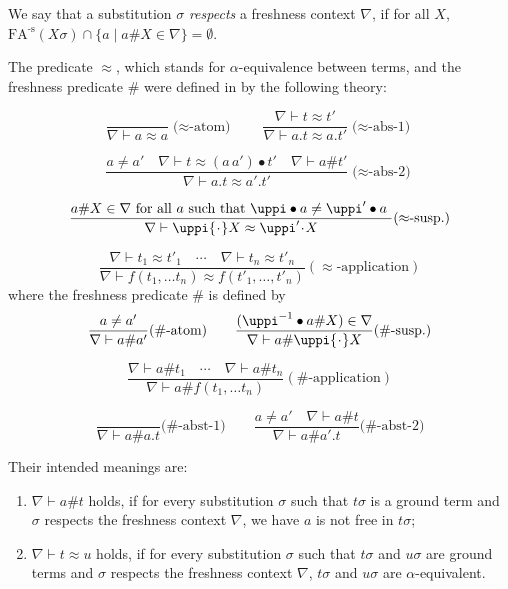 \documentclass{llncs}
\newcommand{\permap}{{\mkern 1mu\cdot \mkern 1mu}}
\newcommand{\permef}{\bullet}
\newcommand\ppi{\uppi}
\newcommand{\fatoms}{\mathrm{FA^{\text{-s}}}}
\begin{document}
We say that a substitution $\sigma$ \emph{respects} a freshness
context $\nabla$, if for all $X$, $\fatoms(X\sigma)\cap
\{a \mid a\# X \in \nabla\} = \emptyset$.

The predicate $\approx$, which stands for $\alpha$-equivalence between terms, 
and the freshness predicate $ \#$ were defined in
\cite{DBLP:conf/csl/UrbanPG03,DBLP:journals/tcs/UrbanPG04} by the following theory:

\[\frac{}{ \nabla\vdash a\approx a}\text{($\approx$-atom)}\qquad \frac{ \nabla \vdash t \approx t'}{ \nabla\vdash a.t\approx a.t'}\text{($\approx$-abs-1)} \]

\[\frac{ a\neq a'\quad \nabla \vdash t \approx (a\,a')\permef t' \quad \nabla \vdash a\# t'}{ \nabla\vdash a.t\approx a'.t'}\text{($\approx$-abs-2)}\]

\[\frac{{ a\# X}\in \nabla \text{ for all $a$ such that $ \ppi \permef a \neq \ppi'\permef a$ }}{ \nabla \vdash \ppi \permap X \approx \ppi'\permap X}\text{($\approx$-susp.)}\]

\[\frac{ \nabla \vdash t_1\approx t'_1 \quad \cdots \quad \nabla \vdash t_n\approx t'_n}{ \nabla \vdash f(t_1,\ldots t_n)\approx f(t'_1,\ldots,t'_n)}(\text{$\approx$-application})\]
%
where the freshness predicate $ \#$ is defined by
%
\[\frac{ a\neq a'}{ \nabla \vdash a\# a'}\text{($\#$-atom)}\qquad \frac{ (\ppi^{-1}\permef a\# X)\in \nabla}{ \nabla \vdash a\#\ppi\permap X}\text{($\#$-susp.)}\]

\[\frac{ \nabla \vdash a\#t_1 \quad \cdots \quad \nabla \vdash a\#t_n}{ \nabla \vdash a\#f(t_1,\ldots t_n)}(\text{$\#$-application})\]

\[\frac{}{ \nabla \vdash a\# a.t}\text{($\#$-abst-1)}\qquad \frac{ a\neq a' \quad \nabla\vdash a\# t}{ \nabla \vdash a\#a'.t}\text{($\#$-abst-2)}\]


Their intended meanings are:
\begin{enumerate}
  \item $ \nabla \vdash a \# t$ holds, if for every substitution
    $\sigma$ such that $t\sigma$ is a ground term and $\sigma$ respects the freshness context $\nabla$, we have $a$ is not
    free in $ t\sigma$;
  \item $ \nabla \vdash t \approx u$ holds, if for every substitution
    $\sigma$ such that $t\sigma$ and $u\sigma$ are ground terms and $\sigma$ respects the freshness context $\nabla$, $t\sigma$ and $u\sigma$ are $\alpha$-equivalent.
\end{enumerate}
\end{document}
